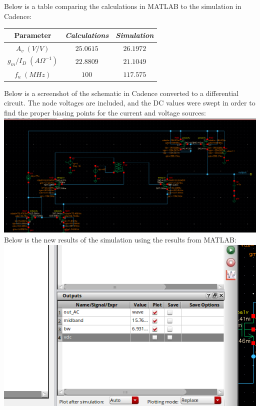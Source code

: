 \documentclass[12pt, fleqn]{article}
\begin{document}
Below is a table comparing the calculations in MATLAB to the simulation in Cadence:\\[0.25cm]
    \begin{table}[H]
    \centering
    \setlength{\tabcolsep}{4pt}
    \renewcommand{\arraystretch}{1.5}
        \begin{tabular}{|c|c|c|}
            \hline
            \textbf{Parameter} & \textit{Calculations} & \textit{Simulation}\\
            \hline
            $A_v\;(V/V)$ & $25.0615$ & $26.1972$\\
            \hline
            $g_m / I_D\;({A\Omega}^{-1})$ & $22.8809$ & $21.1049$\\
            \hline
            $f_u\;(MHz)$ & $100$ & $117.575$\\
            \hline
        \end{tabular}
    \end{table}
\newpage
Below is a screenshot of the schematic in Cadence converted to a differential circuit.  The node voltages are included, and the DC values were swept in order to find the proper biasing points for the current and voltage sources:\\[0.25cm]
\includegraphics[scale=0.35, center]{schem5.PNG}\\[0.25cm]
Below is the new results of the simulation using the results from MATLAB:\\[0.25cm]
\includegraphics[scale=0.475, center]{sim_res6.PNG}\\[0.25cm]
\end{document}
